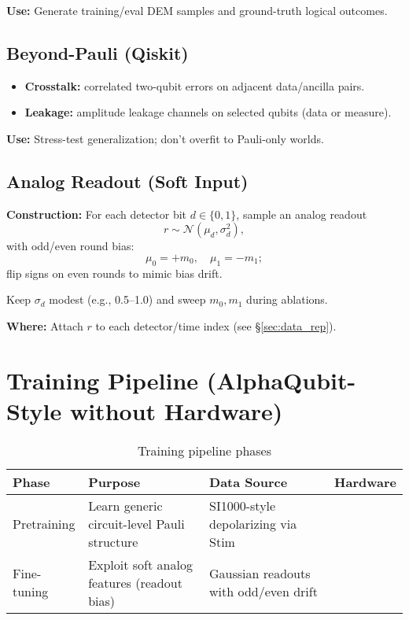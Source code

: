 \documentclass[12pt]{article}
\begin{document}
\textbf{Use:} Generate training/eval DEM samples and ground-truth logical outcomes.

\subsection{Beyond-Pauli (Qiskit)}

\begin{itemize}
    \item \textbf{Crosstalk:} correlated two-qubit errors on adjacent data/ancilla pairs.
    \item \textbf{Leakage:} amplitude leakage channels on selected qubits (data or measure).
\end{itemize}

\textbf{Use:} Stress-test generalization; don't overfit to Pauli-only worlds.

\subsection{Analog Readout (Soft Input)}

\textbf{Construction:} For each detector bit $d \in \{0,1\}$, sample an analog readout
\begin{equation}
r \sim \mathcal{N}(\mu_d, \sigma_d^2),
\end{equation}
with odd/even round bias:
\begin{equation}
\mu_0 = +m_0, \quad \mu_1 = -m_1;
\end{equation}
flip signs on even rounds to mimic bias drift.

Keep $\sigma_d$ modest (e.g., 0.5--1.0) and sweep $m_0, m_1$ during ablations.

\textbf{Where:} Attach $r$ to each detector/time index (see §\ref{sec:data_rep}).

\section{Training Pipeline (AlphaQubit-Style without Hardware)}

\begin{table}[H]
\centering
\begin{tabular}{@{}llll@{}}
\toprule
\textbf{Phase} & \textbf{Purpose} & \textbf{Data Source} & \textbf{Hardware} \\
\midrule
Pretraining & Learn generic circuit-level Pauli structure & SI1000-style depolarizing via Stim &  \\
Fine-tuning & Exploit soft analog features (readout bias) & Gaussian readouts with odd/even drift &  \\
\bottomrule
\end{tabular}
\caption{Training pipeline phases}
\end{table}
\end{document}
